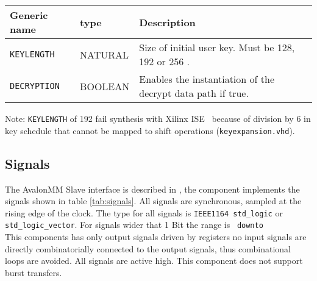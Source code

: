 \documentclass{ruschidoc}
\begin{document}
\begin{tabularx}{\textwidth}{|p{33mm}|p{25mm}|X|}
  \hline
  \bf{Generic name} & \bf{type} & \bf{Description}\\ \hline
  \texttt{KEYLENGTH}  \label{gen:keylength}	& NATURAL   & Size of initial user key. Must be 128, 192 or 256 \footnotemark[1] . \\ \hline
  \texttt{DECRYPTION} \label{gen:decryption}  & BOOLEAN  & Enables the instantiation of the decrypt data path if true. \\
\hline
\end{tabularx}
\label{tab:generics}
Note: \texttt{KEYLENGTH} of 192 fail synthesis with Xilinx ISE \rtm\ because of division by 6 in key schedule that cannot be mapped to shift operations (\texttt{keyexpansion.vhd}).

\subsection{Signals}
\label{sec:signals}
The Avalon\rtm\-MM Slave interface is described in \cite{Altera:Avalon}, the component
implements the signals shown in table \ref{tab:signals}. All signals are synchronous,
sampled at the rising edge of the clock. The type for all signals is \texttt{IEEE1164
    std\_logic} or \texttt{std\_logic\_vector}. For signals wider that 1 Bit the range
is \MSB\ \texttt{downto} \LSB\. \\
This components has only output signals driven by registers no input signals are directly combinatorially connected to the
output signals, thus combinational loops are avoided.  All signals are active
high. This component does not support burst transfers.
\end{document}
